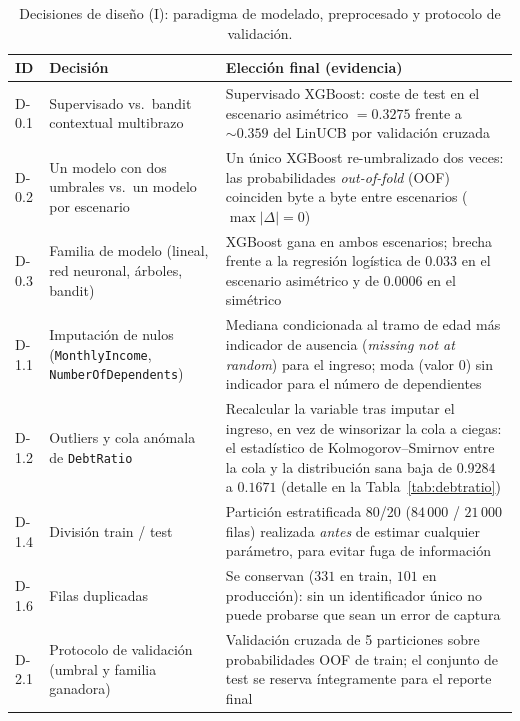 \documentclass[11pt,a4paper]{article}
\begin{document}
\begin{table}[H]
\centering
\footnotesize
\caption{Decisiones de diseño (I): paradigma de modelado, preprocesado y protocolo de validación.}
\label{tab:decisiones-1}
\begin{tabular}{p{1.6cm}p{4.4cm}p{7.5cm}}
\toprule
ID & Decisión & Elección final (evidencia) \\
\midrule
D-0.1 & Supervisado vs.\ bandit contextual multibrazo & Supervisado XGBoost: coste de test en el
escenario asimétrico $=0.3275$ frente a $\sim 0.359$ del LinUCB por validación cruzada \\
D-0.2 & Un modelo con dos umbrales vs.\ un modelo por escenario & Un único XGBoost re-umbralizado
dos veces: las probabilidades \emph{out-of-fold} (OOF) coinciden byte a byte entre escenarios
($\max|\Delta|=0$) \\
D-0.3 & Familia de modelo (lineal, red neuronal, árboles, bandit) & XGBoost gana en ambos
escenarios; brecha frente a la regresión logística de $0.033$ en el escenario asimétrico y de
$0.0006$ en el simétrico \\
D-1.1 & Imputación de nulos (\texttt{MonthlyIncome}, \texttt{NumberOfDependents}) & Mediana
condicionada al tramo de edad más indicador de ausencia (\emph{missing not at random}) para el
ingreso; moda (valor $0$) sin indicador para el número de dependientes \\
D-1.2 & Outliers y cola anómala de \texttt{DebtRatio} & Recalcular la variable tras imputar el
ingreso, en vez de winsorizar la cola a ciegas: el estadístico de Kolmogorov--Smirnov entre la cola
y la distribución sana baja de $0.9284$ a $0.1671$ (detalle en la Tabla~\ref{tab:debtratio}) \\
D-1.4 & División train / test & Partición estratificada 80/20 ($84\,000$ / $21\,000$ filas)
realizada \emph{antes} de estimar cualquier parámetro, para evitar fuga de información \\
D-1.6 & Filas duplicadas & Se conservan ($331$ en train, $101$ en producción): sin un identificador
único no puede probarse que sean un error de captura \\
D-2.1 & Protocolo de validación (umbral y familia ganadora) & Validación cruzada de 5 particiones
sobre probabilidades OOF de train; el conjunto de test se reserva íntegramente para el reporte
final \\
\bottomrule
\end{tabular}
\end{table}
\end{document}
